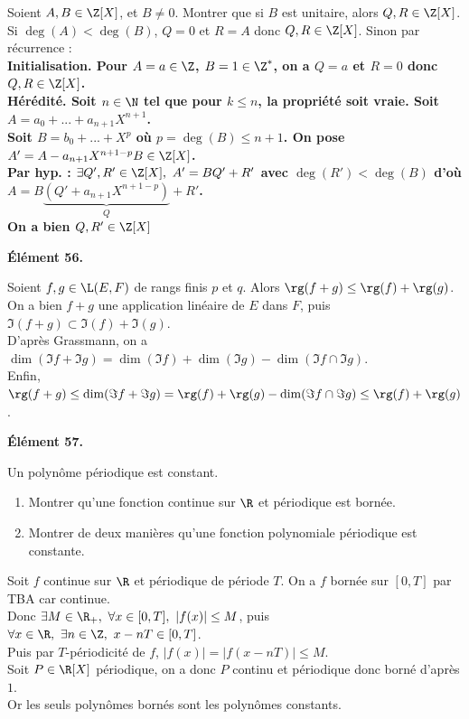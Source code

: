 \documentclass[11pt]{article}
\begin{document}
\begin{ex}{}{}
    Soient $A,B\in\Z[X]$, et $B\neq0$. Montrer que si $B$ est unitaire, alors $Q,R\in\Z[X]$.
    \tcblower
    Si $\deg(A)<\deg(B)$, $Q=0$ et $R=A$ donc $Q,R\in\Z[X]$. Sinon par récurrence :\\
    \bf{Initialisation.} Pour $A=a\in\Z$, $B=1\in\Z^*$, on a $Q=a$ et $R=0$ donc $Q,R\in\Z[X]$.\\
    \bf{Hérédité.} Soit $n\in\N$ tel que pour $k\leq n$, la propriété soit vraie. Soit $A=a_0+...+a_{n+1}X^{n+1}$.\\
    Soit $B=b_0+...+X^p$ où $p=\deg(B)\leq n+1$. On pose $A'=A-a_{n+1}X^{n+1-p}B\in\Z[X]$.\\
    Par hyp. : $\exists Q',R'\in\Z[X], ~ A'=BQ'+R'$ avec $\deg(R')<\deg(B)$ d'où $A=B\underbrace{(Q'+a_{n+1}X^{n+1-p})}_{Q}+R'$.\\
    On a bien $Q,R'\in\Z[X]$
\end{ex}

\begin{center}
    \bf{Élément 56.}
\end{center}

\begin{prop}{}{}
    Soient $f,g\in\L(E,F)$ de rangs finis $p$ et $q$. Alors $\rg(f+g)\leq\rg(f)+\rg(g)$.
    \tcblower
    On a bien $f+g$ une application linéaire de $E$ dans $F$, puis $\Im(f+g)\subset\Im(f)+\Im(g)$.\\
    D'après Grassmann, on a $\dim(\Im f + \Im g)=\dim(\Im f) + \dim(\Im g) - \dim(\Im f \cap \Im g)$.\\
    Enfin, $\rg(f+g)\leq\dim(\Im f + \Im g)=\rg(f) + \rg(g)  - \dim(\Im f \cap \Im g)\leq \rg(f) + \rg(g)$.
\end{prop}

\begin{center}
    \bf{Élément 57.}
\end{center}

\begin{ex}{Un polynôme périodique est constant.}{}
    \begin{enumerate}
        \item Montrer qu'une fonction continue sur $\R$ et périodique est bornée.
        \item Montrer de deux manières qu'une fonction polynomiale périodique est constante.
    \end{enumerate}
    \tcblower
     Soit $f$ continue sur $\R$ et périodique de période $T$. On a $f$ bornée sur $[0,T]$ par TBA car continue.\\
    Donc $\exists M \in \R_+, ~ \forall x \in [0,T], ~ |f(x)| \leq M$, puis $\forall x \in \R, ~ \exists n \in \Z, ~ x-nT\in[0,T]$.\\
    Puis par $T$-périodicité de $f$, $|f(x)|=|f(x-nT)|\leq M$.\\
     Soit $P\in\R[X]$ périodique, on a donc $P$ continu et périodique donc borné d'après $1.$\\
    Or les seuls polynômes bornés sont les polynômes constants.
\end{ex}
\end{document}
